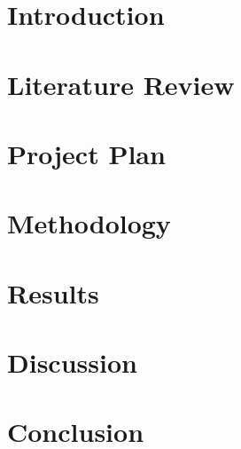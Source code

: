 \documentclass[
12pt, %
oneside, %
english, %
onehalfspacing, %
headsepline, %
]{MastersDoctoralThesis} %
\begin{document}



\mainmatter %

\pagestyle{thesis} %


\chapter{Introduction}


\chapter{Literature Review}


\chapter{Project Plan}


\chapter{Methodology}


\chapter{Results}


\chapter{Discussion}


\chapter{Conclusion}

\end{document}
